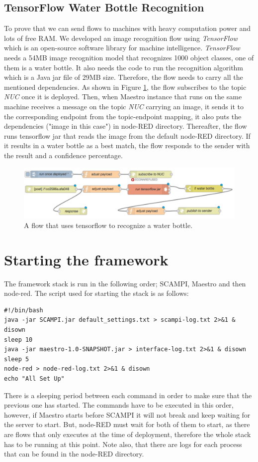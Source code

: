 \subsection{TensorFlow Water Bottle Recognition} \label{subsec:tensor}
To prove that we can send flows to machines with heavy computation power and lots of free RAM. We developed an image recognition flow using \textit{TensorFlow} which is an open-source software library for machine intelligence. \textit{TensorFlow} needs a 54MB image recognition model that recognizes 1000 object classes, one of them is a water bottle. It also needs the code to run the recognition algorithm which is a Java jar file of 29MB size. Therefore, the flow  needs to carry all the mentioned dependencies. As shown in Figure \ref{fig:flow-tensor}, the flow subscribes to the topic \textit{NUC} once it is deployed. Then, when Maestro instance that runs on the same machine receives a message on the topic \textit{NUC} carrying an image, it sends it to the corresponding endpoint  from the topic-endpoint mapping, it also puts the dependencies ("image in this case") in node-RED directory. Thereafter, the flow runs tensorflow jar that reads the image from the default node-RED directory. If it results in a water bottle as a best match, the flow responds to the sender with the result and a confidence percentage.
 \begin{figure}[H]
	\centering
	\includegraphics[scale=0.6]{images/flow-tensor.png}
	\caption{A flow that uses tensorflow to recognize a water bottle.}
	\label{fig:flow-tensor}
\end{figure} 

\section{Starting the framework}\label{subsec:starting-framework}

The framework stack is run in the following order; SCAMPI, Maestro and then node-red. The script used for starting the stack is as follows:
\begin{verbatim}
#!/bin/bash
java -jar SCAMPI.jar default_settings.txt > scampi-log.txt 2>&1 & disown
sleep 10
java -jar maestro-1.0-SNAPSHOT.jar > interface-log.txt 2>&1 & disown
sleep 5
node-red > node-red-log.txt 2>&1 & disown
echo "All Set Up"
\end{verbatim}
There is a sleeping period between each command in order to make sure that the previous one has started. The commands have to be executed in this order, however, if Maestro starts before SCAMPI it will not break and keep waiting for the server to start. But, node-RED must wait for both of them to start, as there are flows that only executes at the time of deployment, therefore the whole stack has to be running at this point. Note also, that there are logs for each process that can be found in the node-RED directory. 


